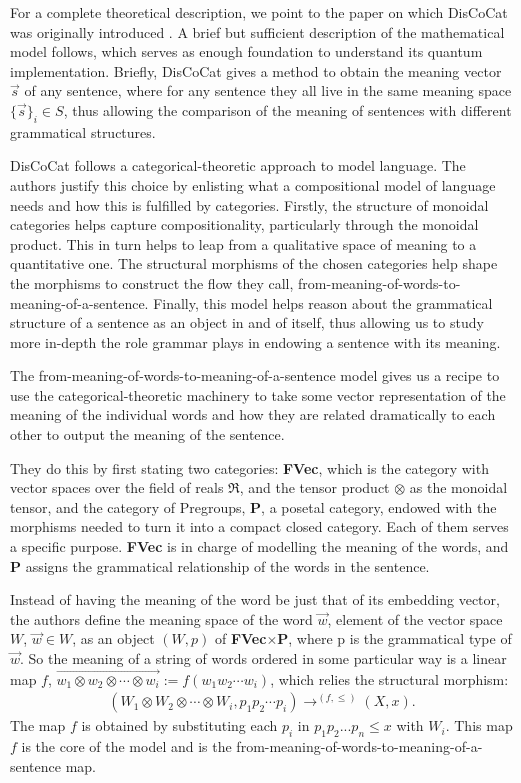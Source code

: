 For a complete theoretical description, we point to the paper on which DisCoCat was originally introduced \cite{coecke_mathematical_2010}. A brief but sufficient description of the mathematical model follows, which serves as enough foundation to understand its quantum implementation. Briefly, DisCoCat gives a method to obtain the meaning vector $\Vec{s}$ of any sentence, where for any sentence they all live in the same meaning space $\{ \Vec{s}\}_i \in S$, thus allowing the comparison of the meaning of sentences with different grammatical structures.

DisCoCat follows a categorical-theoretic approach to model language. The authors justify this choice by enlisting what a compositional model of language needs and how this is fulfilled by categories. Firstly, the structure of monoidal categories helps capture compositionality, particularly through the monoidal product. This in turn helps to leap from a qualitative space of meaning to a quantitative one. The structural morphisms of the chosen categories help shape the morphisms to construct the flow they call, from-meaning-of-words-to-meaning-of-a-sentence. Finally, this model helps reason about the grammatical structure of a sentence as an object in and of itself, thus allowing us to study more in-depth the role grammar plays in endowing a sentence with its meaning.

The from-meaning-of-words-to-meaning-of-a-sentence model gives us a recipe to use the categorical-theoretic machinery to take some vector representation of the meaning of the individual words and how they are related dramatically to each other to output the meaning of the sentence. 

They do this by first stating two categories: \textbf{FVec}, which is the category with vector spaces over the field of reals $\Re$, and the tensor product $\otimes$ as the monoidal tensor, and the category of Pregroups, \textbf{P}, a posetal category, endowed with the morphisms needed to turn it into a compact closed category. Each of them serves a specific purpose. \textbf{FVec} is in charge of modelling the meaning of the words, and \textbf{P} assigns the grammatical relationship of the words in the sentence.

Instead of having the meaning of the word be just that of its embedding vector, the authors define the meaning space of the word $\Vec{w}$, element of the vector space $W$, $\Vec{w} \in W$, as an object $(W,p)$ of \textbf{FVec}$\times$\textbf{P}, where p is the grammatical type of $\Vec{w}$. So the meaning of a string of words ordered in some particular way is a linear map $f$, $\overrightarrow{w_1\otimes w_2\otimes \cdots \otimes w_i}:=f(w_1w_2\cdots w_i)$, which relies the structural morphism: 
\begin{align}
    (W_1\otimes W_2 \otimes \cdots \otimes W_i,p_1p_2\cdots p_i)\rightarrow^{(f,\leq)}(X,x).
\end{align}
The map $f$ is obtained by substituting each $p_i$ in $p_1p_2...p_n\leq x$ with $W_i$. This map $f$ is the core of the model and is the from-meaning-of-words-to-meaning-of-a-sentence map.

